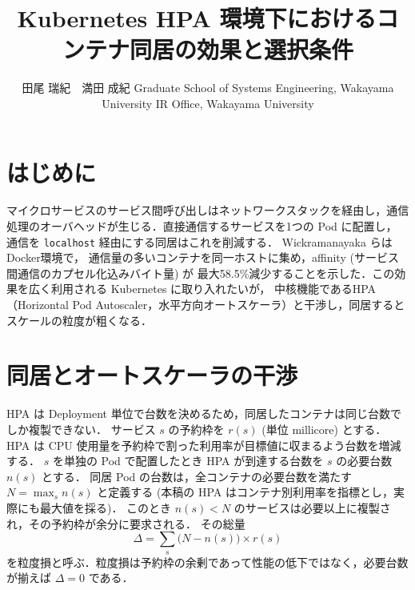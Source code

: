 \documentclass[T,J]{fose}
\begin{document}
\title{Kubernetes HPA 環境下におけるコンテナ同居の効果と選択条件}

\author{田尾 瑞紀　満田 成紀
{Graduate School of Systems Engineering, Wakayama University}
{IR Office, Wakayama University}
}


\maketitle \thispagestyle{empty}


\section{はじめに}

マイクロサービスのサービス間呼び出しはネットワークスタックを経由し，通信処理のオーバヘッドが生じる．直接通信するサービスを1つの Pod に配置し，
通信を \texttt{localhost} 経由にする同居はこれを削減する．
Wickramanayaka ら\cite{wickramanayaka2022}は Docker環境で，
通信量の多いコンテナを同一ホストに集め，affinity (サービス間通信のカプセル化込みバイト量) が
最大58.5\%減少することを示した．この効果を広く利用される Kubernetes に取り入れたいが，
中核機能であるHPA（Horizontal Pod Autoscaler，水平方向オートスケーラ）と干渉し，同居するとスケールの粒度が粗くなる．


\section{同居とオートスケーラの干渉}

HPA は Deployment 単位で台数を決めるため，同居したコンテナは同じ台数でしか複製できない．
サービス $s$ の予約枠を $r(s)$ (単位 millicore) とする．
HPA は CPU 使用量を予約枠で割った利用率が目標値に収まるよう台数を増減する．
$s$ を単独の Pod で配置したとき HPA が到達する台数を $s$ の必要台数 $n(s)$ とする．
同居 Pod の台数は，全コンテナの必要台数を満たす $N = \max_s n(s)$ と定義する
(本稿の HPA はコンテナ別利用率を指標とし，実際にも最大値を採る)．
このとき $n(s) < N$ のサービスは必要以上に複製され，その予約枠が余分に要求される．
その総量
\begin{equation}
	\Delta = \sum_{s} \bigl( N - n(s) \bigr) \times r(s)
	\label{eq:loss}
\end{equation}
を粒度損と呼ぶ．粒度損は予約枠の余剰であって性能の低下ではなく，必要台数が揃えば $\Delta = 0$ である．
\end{document}

